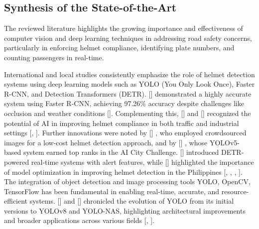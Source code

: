 \begin{refsection}
\section{Synthesis of the State-of-the-Art}
The reviewed literature highlights the growing importance and effectiveness of computer vision and deep learning techniques in addressing road safety concerns, particularly in enforcing helmet compliance, identifying plate numbers, and counting passengers in real-time.

International and local studies consistently emphasize the role of helmet detection systems using deep learning models such as YOLO (You Only Look Once), Faster R-CNN, and Detection Transformers (DETR). \citeauthor{afzal2021helmet} [\citeyear{afzal2021helmet}] demonstrated a highly accurate system using Faster R-CNN, achieving 97.26\% accuracy despite challenges like occlusion and weather conditions [\cite{afzal2021helmet}]. Complementing this, \citeauthor{singh2024visual} [\citeyear{singh2024visual}] and \citeauthor{giron2020motorcycle} [\citeyear {giron2020motorcycle}] recognized the potential of AI in improving helmet compliance in both traffic and industrial settings [\cite{singh2024visual}, \cite{giron2020motorcycle}]. Further innovations were noted by \citeauthor{siebert2024urban} [\citeyear{siebert2024urban}] , who employed crowdsourced images for a low-cost helmet detection approach, and by \citeauthor{Soltanikazemi} [\citeyear{Soltanikazemi}]  , whose YOLOv5-based system earned top ranks in the AI City Challenge. \citeauthor{mutyala2023helmet} [\citeyear{mutyala2023helmet}] introduced DETR-powered real-time systems with alert features, while \citeauthor{tomas2023motorcycle} [\citeyear{tomas2023motorcycle}] highlighted the importance of model optimization in improving helmet detection in the Philippines [\cite{siebert2024urban}, \cite{soltanikazemi2023helmet}, \cite{mutyala2023helmet}, \cite{tomas2023motorcycle}].
The integration of object detection and image processing tools YOLO, OpenCV, TensorFlow has been fundamental in enabling real-time, accurate, and resource-efficient systems. \citeauthor{jiang2022review} [\citeauthor{jiang2022review}] and \citeauthor{terven2022comprehensive} [\citeyear{terven2022comprehensive}] chronicled the evolution of YOLO from its initial versions to YOLOv8 and YOLO-NAS, highlighting architectural improvements and broader applications across various fields [\cite{jiang2022review}, \cite{terven2022comprehensive}]. 


\end{refsection}

